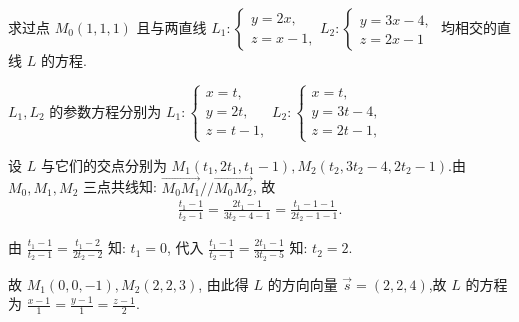 \begin{example}
	求过点 $M_0(1,1,1)$ 且与两直线 $L_1:\left\{\begin{array}{l}y=2 x, \\ z=x-1,\end{array} L_2:\left\{\begin{array}{l}y=3 x-4, \\ z=2 x-1\end{array}\right.\right.$ 均相交的直线 $L$ 的方程.
\end{example}
\begin{solution}
	$L_1 ,  L_2$ 的参数方程分别为 $L_1:\left\{\begin{array}{l}x=t, \\ y=2 t, \\ z=t-1,\end{array} L_2:\left\{\begin{array}{l}x=t, \\ y=3 t-4, \\ z=2 t-1,\end{array}\right.\right.$

	设 $L$ 与它们的交点分别为 $M_1\left(t_1, 2 t_1, t_1-1\right), M_2\left(t_2, 3 t_2-4,2 t_2-1\right)$.由 $M_0 ,  M_1 ,  M_2$ 三点共线知: $\overrightarrow{M_0 M_1} / / \overrightarrow{M_0 M_2}$, 故
	\begin{align*}
		\frac{t_1-1}{t_2-1}=\frac{2 t_1-1}{3 t_2-4-1}=\frac{t_1-1-1}{2 t_2-1-1} .
	\end{align*}

	由 $\frac{t_1-1}{t_2-1}=\frac{t_1-2}{2 t_2-2}$ 知: $t_1=0$, 代入 $\frac{t_1-1}{t_2-1}=\frac{2 t_1-1}{3 t_2-5}$ 知: $t_2=2$.

	故 $M_1(0,0,-1), M_2(2,2,3)$, 由此得 $L$ 的方向向量 $\vec{s}=(2,2,4)$,故 $L$ 的方程为 $\frac{x-1}{1}=\frac{y-1}{1}=\frac{z-1}{2}$.
\end{solution}

